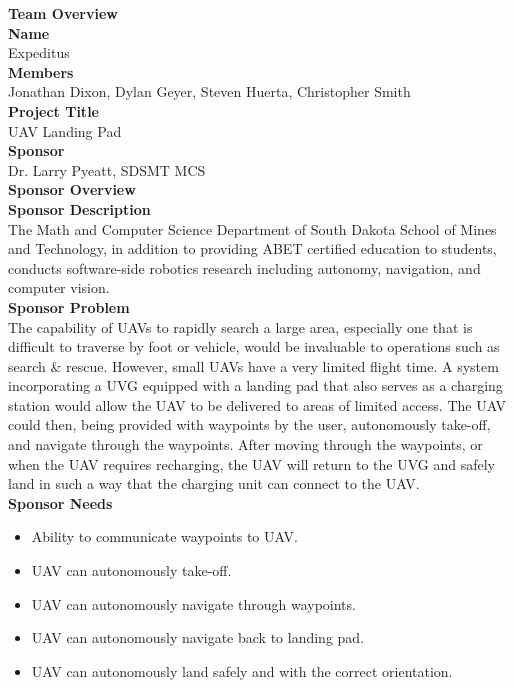 \Large{\textbf{Team Overview}}
\\[-3mm]\noindent\makebox[\linewidth]{\rule{\textwidth}{0.4pt}}
\normalsize{\textbf{Name}}
\\Expeditus
\\[3mm]
\normalsize{\textbf{Members}}
\\ Jonathan Dixon, Dylan Geyer, Steven Huerta, Christopher Smith
\\[3mm]
\normalsize{\textbf{Project Title}}
\\ UAV Landing Pad
\\[3mm]
\normalsize{\textbf{Sponsor}}
\\ Dr. Larry Pyeatt, SDSMT MCS
\\[10mm]
\Large{\textbf{Sponsor Overview}}
\\[-3mm]\noindent\makebox[\linewidth]{\rule{\textwidth}{0.4pt}}
\normalsize{\textbf{Sponsor Description}}
\\ The Math and Computer Science Department of South Dakota School of Mines and Technology, in addition to providing ABET certified education to students, conducts software-side robotics research including autonomy, navigation, and computer vision. 
\\[3mm]
\normalsize{\textbf{Sponsor Problem}}
\\ The capability of UAVs to rapidly search a large area, especially one that is difficult to traverse by foot or vehicle, would be invaluable to operations such as search \& rescue. However, small UAVs have a very limited flight time. A system incorporating a UVG equipped with a landing pad that also serves as a charging station would allow the UAV to be delivered to areas of limited access. The UAV could then, being provided with waypoints by the user, autonomously take-off, and navigate through the waypoints. After moving through the waypoints, or when the UAV requires recharging, the UAV will return to the UVG and safely land in such a way that the charging unit can connect to the UAV.
\\[3mm]
\normalsize{\textbf{Sponsor Needs}}
\begin{itemize}
\item Ability to communicate waypoints to UAV.
\item UAV can autonomously take-off.
\item UAV can autonomously navigate through waypoints.
\item UAV can autonomously navigate back to landing pad.
\item UAV can autonomously land safely and with the correct orientation.
\end{itemize}
